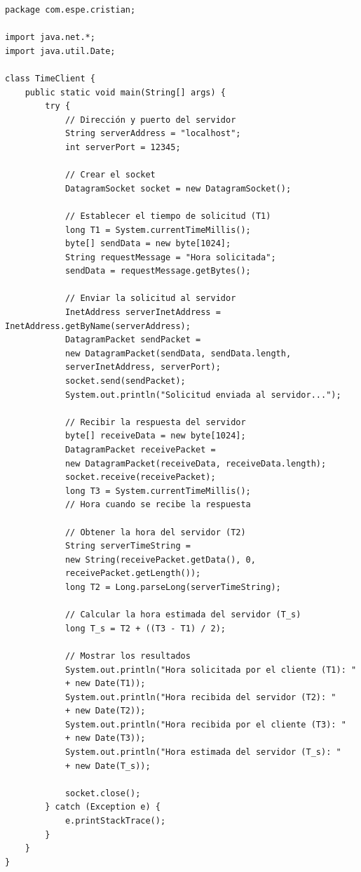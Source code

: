 \documentclass[a4paper,12pt]{report}
\begin{document}
\begin{verbatim}
package com.espe.cristian;

import java.net.*;
import java.util.Date;

class TimeClient {
    public static void main(String[] args) {
        try {
            // Dirección y puerto del servidor
            String serverAddress = "localhost";
            int serverPort = 12345;

            // Crear el socket
            DatagramSocket socket = new DatagramSocket();

            // Establecer el tiempo de solicitud (T1)
            long T1 = System.currentTimeMillis();
            byte[] sendData = new byte[1024];
            String requestMessage = "Hora solicitada";
            sendData = requestMessage.getBytes();

            // Enviar la solicitud al servidor
            InetAddress serverInetAddress = InetAddress.getByName(serverAddress);
            DatagramPacket sendPacket = 
            new DatagramPacket(sendData, sendData.length, 
            serverInetAddress, serverPort);
            socket.send(sendPacket);
            System.out.println("Solicitud enviada al servidor...");

            // Recibir la respuesta del servidor
            byte[] receiveData = new byte[1024];
            DatagramPacket receivePacket = 
            new DatagramPacket(receiveData, receiveData.length);
            socket.receive(receivePacket);
            long T3 = System.currentTimeMillis(); 
            // Hora cuando se recibe la respuesta

            // Obtener la hora del servidor (T2)
            String serverTimeString = 
            new String(receivePacket.getData(), 0,
            receivePacket.getLength());
            long T2 = Long.parseLong(serverTimeString);

            // Calcular la hora estimada del servidor (T_s)
            long T_s = T2 + ((T3 - T1) / 2);

            // Mostrar los resultados
            System.out.println("Hora solicitada por el cliente (T1): "
            + new Date(T1));
            System.out.println("Hora recibida del servidor (T2): "
            + new Date(T2));
            System.out.println("Hora recibida por el cliente (T3): "
            + new Date(T3));
            System.out.println("Hora estimada del servidor (T_s): "
            + new Date(T_s));

            socket.close();
        } catch (Exception e) {
            e.printStackTrace();
        }
    }
}

\end{verbatim}
\end{document}
